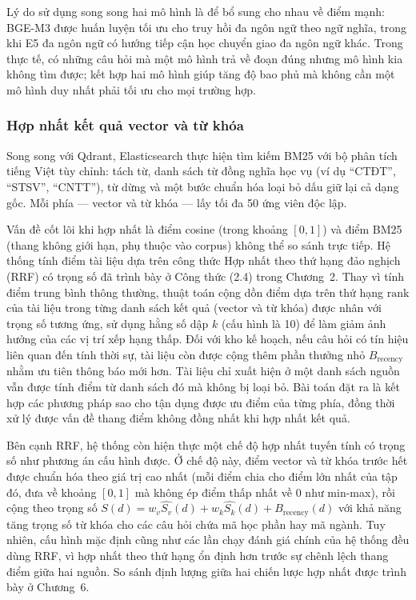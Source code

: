 \documentclass[../DoAn.tex]{subfiles}
\begin{document}
Lý do sử dụng song song hai mô hình là để bổ sung cho nhau về điểm mạnh: BGE-M3
được huấn luyện tối ưu cho truy hồi đa ngôn ngữ theo ngữ nghĩa, trong khi E5
đa ngôn ngữ có hướng tiếp cận học chuyển giao đa ngôn ngữ khác. Trong thực tế,
có những câu hỏi mà một mô hình trả về đoạn đúng nhưng mô hình kia không tìm
được; kết hợp hai mô hình giúp tăng độ bao phủ mà không cần một mô hình duy
nhất phải tối ưu cho mọi trường hợp.

\subsubsection{Hợp nhất kết quả vector và từ khóa}

Song song với Qdrant, Elasticsearch thực hiện tìm kiếm BM25 với bộ phân tích
tiếng Việt tùy chỉnh: tách từ, danh sách từ đồng nghĩa học vụ (ví dụ
``CTĐT'', ``STSV'', ``CNTT''), từ dừng và một bước chuẩn hóa loại bỏ dấu giữ
lại cả dạng gốc. Mỗi phía --- vector và từ khóa --- lấy tối đa 50 ứng viên độc lập.

Vấn đề cốt lõi khi hợp nhất là điểm cosine (trong khoảng $[0,1]$) và điểm BM25
(thang không giới hạn, phụ thuộc vào corpus) không thể so sánh trực tiếp. Hệ thống tính điểm tài liệu dựa trên công thức Hợp nhất theo thứ hạng đảo nghịch (RRF) có trọng số đã trình bày ở Công thức (2.4) trong Chương~2. Thay vì tính điểm trung bình thông thường, thuật toán cộng dồn điểm dựa trên thứ hạng $\text{rank}$ của tài liệu trong từng danh sách kết quả (vector và từ khóa) được nhân với trọng số tương ứng, sử dụng hằng số dập $k$ (cấu hình là 10) để làm giảm ảnh hưởng của các vị trí xếp hạng thấp. Đối với kho kế hoạch, nếu câu hỏi có tín hiệu liên quan đến tính thời sự, tài liệu còn được cộng thêm phần thưởng nhỏ $B_{\text{recency}}$ nhằm ưu tiên thông báo mới hơn. Tài liệu chỉ xuất hiện ở một danh sách nguồn vẫn được tính điểm từ danh sách đó mà không bị loại bỏ. Bài toán đặt
ra là kết hợp các phương pháp sao cho tận dụng được ưu điểm của từng phía, đồng
thời xử lý được vấn đề thang điểm không đồng nhất khi hợp nhất kết quả.

Bên cạnh RRF, hệ thống còn hiện thực một chế độ hợp nhất tuyến tính có trọng số
như phương án cấu hình được. Ở chế độ này, điểm vector và từ khóa trước hết
được chuẩn hóa theo giá trị cao nhất (mỗi điểm chia cho điểm lớn nhất của tập
đó, đưa về khoảng $[0,1]$ mà không ép điểm thấp nhất về 0 như min-max), rồi
cộng theo trọng số $S(d) = w_v \widehat{S_v}(d) + w_k \widehat{S_k}(d) +
B_{\text{recency}}(d)$ với khả năng tăng trọng số từ khóa cho các câu hỏi chứa
mã học phần hay mã ngành. Tuy nhiên, cấu hình mặc định cũng như các lần chạy
đánh giá chính của hệ thống đều dùng RRF, vì hợp nhất theo thứ hạng ổn định hơn
trước sự chênh lệch thang điểm giữa hai nguồn. So sánh định lượng giữa hai
chiến lược hợp nhất được trình bày ở Chương~6.
\end{document}
